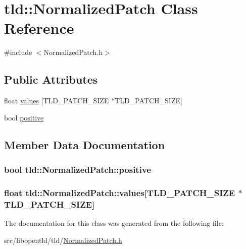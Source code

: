 \hypertarget{classtld_1_1_normalized_patch}{
\section{tld::NormalizedPatch Class Reference}
\label{classtld_1_1_normalized_patch}
}


{\ttfamily \#include $<$NormalizedPatch.h$>$}

\subsection*{Public Attributes}
\begin{DoxyCompactItemize}
\item 
float \hyperlink{classtld_1_1_normalized_patch_ae76afafa7dd50901d7c468b92d1c1df5}{values} \mbox{[}TLD\_\-PATCH\_\-SIZE $\ast$TLD\_\-PATCH\_\-SIZE\mbox{]}
\item 
bool \hyperlink{classtld_1_1_normalized_patch_a0d064e4aea00c363f5b0eb768cf743ea}{positive}
\end{DoxyCompactItemize}


\subsection{Member Data Documentation}
\hypertarget{classtld_1_1_normalized_patch_a0d064e4aea00c363f5b0eb768cf743ea}{
\subsubsection[{positive}]{\setlength{\rightskip}{0pt plus 5cm}bool {\bf tld::NormalizedPatch::positive}}}
\label{classtld_1_1_normalized_patch_a0d064e4aea00c363f5b0eb768cf743ea}
\hypertarget{classtld_1_1_normalized_patch_ae76afafa7dd50901d7c468b92d1c1df5}{
\subsubsection[{values}]{\setlength{\rightskip}{0pt plus 5cm}float {\bf tld::NormalizedPatch::values}\mbox{[}TLD\_\-PATCH\_\-SIZE $\ast$TLD\_\-PATCH\_\-SIZE\mbox{]}}}
\label{classtld_1_1_normalized_patch_ae76afafa7dd50901d7c468b92d1c1df5}


The documentation for this class was generated from the following file:\begin{DoxyCompactItemize}
\item 
src/libopentld/tld/\hyperlink{_normalized_patch_8h}{NormalizedPatch.h}\end{DoxyCompactItemize}
